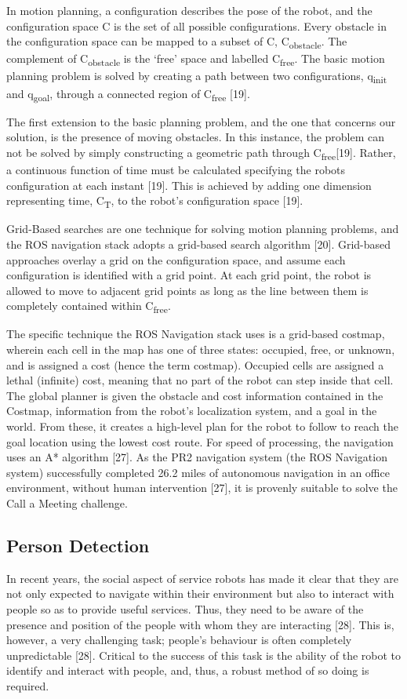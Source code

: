 \documentclass{article}
\begin{document}
In motion planning, a configuration describes the pose of the robot, and the configuration space C is the set of all possible configurations. Every obstacle in the configuration space can be mapped to a subset of C, C\textsubscript{obstacle}. The complement of C\textsubscript{obstacle} is the ‘free’ space and labelled C\textsubscript{free}. The basic motion planning problem is solved by creating a path between two configurations, q\textsubscript{init} and q\textsubscript{goal}, through a connected region of C\textsubscript{free} [19].

The first extension to the basic planning problem, and the one that concerns our solution, is the presence of moving obstacles. In this instance, the problem can not be solved by simply constructing a geometric path through C\textsubscript{free}[19]. Rather, a continuous function of time must be calculated specifying the robots configuration at each instant [19]. This is achieved by adding one dimension representing time, C\textsubscript{T}, to the robot’s configuration space [19].

Grid-Based searches are one technique for solving motion planning problems, and the ROS navigation stack adopts a grid-based search algorithm [20]. Grid-based approaches overlay a grid on the configuration space, and assume each configuration is identified with a grid point. At each grid point, the robot is allowed to move to adjacent grid points as long as the line between them is completely contained within C\textsubscript{free}.

The specific technique the ROS Navigation stack uses is a grid-based costmap, wherein each cell in the map has one of three states: occupied, free, or unknown, and is assigned a cost (hence the term costmap). Occupied cells are assigned a lethal (infinite) cost, meaning that no part of the robot can step inside that cell. The global planner is given the obstacle and cost information contained in the Costmap, information from the robot’s localization system, and a goal in the world. From these, it creates a high-level plan for the robot to follow to reach the goal location using the lowest cost route. For speed of processing, the navigation uses an A* algorithm [27]. As the PR2 navigation system (the ROS Navigation system) successfully completed 26.2 miles of autonomous navigation in an office environment, without human intervention [27], it is provenly suitable to solve the Call a Meeting challenge.

\subsection{Person Detection}
In recent years, the social aspect of service robots has made it clear that they are not only expected to navigate within their environment but also to interact with people so as to provide useful services.  Thus, they need to be aware of the presence and position of the people with whom they are interacting [28]. This is, however, a very challenging task; people’s behaviour is often completely unpredictable [28]. Critical to the success of this task is the ability of the robot to identify and interact with people, and, thus, a robust method of so doing is required.
\end{document}
